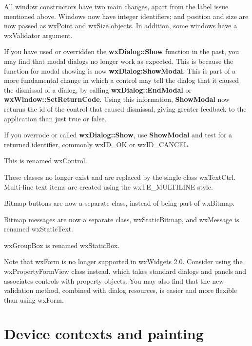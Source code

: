 
All window constructors have two main changes, apart from the label issue mentioned above.
Windows now have integer identifiers; and position and size are now passed as wxPoint and
wxSize objects. In addition, some windows have a wxValidator argument.


If you have used or overridden the {\bf wxDialog::Show} function in the past, you may find
that modal dialogs no longer work as expected. This is because the function for modal showing
is now {\bf wxDialog:ShowModal}. This is part of a more fundamental change in which a
control may tell the dialog that it caused the dismissal of a dialog, by
calling {\bf wxDialog::EndModal} or {\bf wxWindow::SetReturnCode}. Using this
information, {\bf ShowModal} now returns the id of the control that caused dismissal,
giving greater feedback to the application than just true or false.

If you overrode or called {\bf wxDialog::Show}, use {\bf ShowModal} and test for a returned identifier,
commonly wxID\_OK or wxID\_CANCEL.


This is renamed wxControl.


These classes no longer exist and are replaced by the single class wxTextCtrl.
Multi-line text items are created using the wxTE\_MULTILINE style.


Bitmap buttons are now a separate class, instead of being part of wxBitmap.


Bitmap messages are now a separate class, wxStaticBitmap, and wxMessage
is renamed wxStaticText.


wxGroupBox is renamed wxStaticBox.


Note that wxForm is no longer supported in wxWidgets 2.0. Consider using the wxPropertyFormView class
instead, which takes standard dialogs and panels and associates controls with property objects.
You may also find that the new validation method, combined with dialog resources, is easier
and more flexible than using wxForm.

\section{Device contexts and painting}\label{portingdc}

